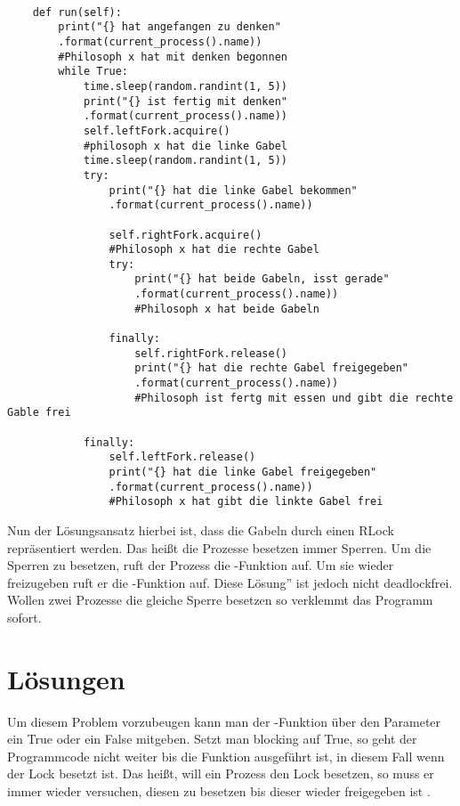 \begin{lstlisting}[style = Python, label = {erste Lösung}, caption = {erste Lösung}]

    def run(self):
        print("{} hat angefangen zu denken"
        .format(current_process().name)) 
        #Philosoph x hat mit denken begonnen
        while True:
            time.sleep(random.randint(1, 5))
            print("{} ist fertig mit denken"
            .format(current_process().name))
            self.leftFork.acquire() 
            #philosoph x hat die linke Gabel
            time.sleep(random.randint(1, 5))
            try:
                print("{} hat die linke Gabel bekommen"
                .format(current_process().name))

                self.rightFork.acquire() 
                #Philosoph x hat die rechte Gabel
                try:
                    print("{} hat beide Gabeln, isst gerade"
                    .format(current_process().name)) 
                    #Philosoph x hat beide Gabeln

                finally:
                    self.rightFork.release()
                    print("{} hat die rechte Gabel freigegeben"
                    .format(current_process().name)) 
                    #Philosoph ist fertg mit essen und gibt die rechte Gable frei

            finally:
                self.leftFork.release()
                print("{} hat die linke Gabel freigegeben"
                .format(current_process().name)) 
                #Philosoph x hat gibt die linkte Gabel frei

\end{lstlisting}

Nun der Lösungsansatz hierbei ist, dass die Gabeln durch einen RLock repräsentiert werden. Das heißt die Prozesse besetzen immer Sperren. Um die Sperren zu besetzen, ruft der Prozess die -Funktion auf. Um sie wieder freizugeben ruft er die -Funktion auf. Diese \glqq Lösung'' ist jedoch nicht deadlockfrei. Wollen zwei Prozesse die gleiche Sperre besetzen so verklemmt das Programm sofort. 

\section{Lösungen}
\label{endlösung}

Um diesem Problem vorzubeugen kann man der -Funktion über den Parameter  ein True oder ein False mitgeben. Setzt man blocking auf True, so geht der Programmcode nicht weiter bis die Funktion ausgeführt ist, in diesem Fall wenn der Lock besetzt ist. Das heißt, will ein Prozess den Lock besetzen, so muss er immer wieder versuchen, diesen zu besetzen bis dieser wieder freigegeben ist \parencite[vgl. ]{lock}. 

